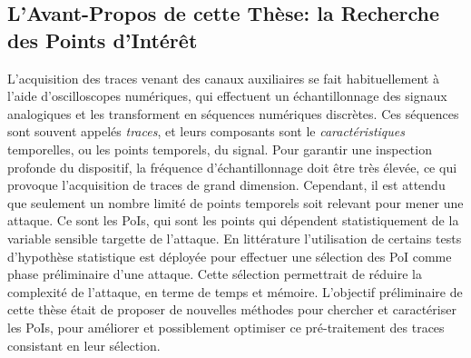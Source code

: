 \subsection{L'Avant-Propos de cette Th\`{e}se: la Recherche des Points d'Int\'{e}r\^{e}t}\label{sec:foreword}
L'acquisition des traces venant des canaux auxiliaires se fait habituellement \`{a} l'aide d'oscilloscopes num\'{e}riques, qui effectuent un \'{e}chantillonnage des signaux analogiques et les transforment en s\'{e}quences num\'{e}riques discr\`{e}tes. Ces s\'{e}quences sont souvent appel\'{e}s \emph{traces}, et leurs composants sont le \emph{caract\'{e}ristiques} temporelles, ou les points temporels, du signal. Pour garantir une inspection profonde du dispositif, la fr\'{e}quence d'\'{e}chantillonnage doit \^{e}tre tr\`{e}s \'{e}lev\'{e}e, ce qui provoque l'acquisition de traces de grand dimension. Cependant, il est attendu que seulement un nombre limit\'{e} de points temporels soit relevant pour mener une attaque. Ce sont les PoIs, qui sont les points qui d\'{e}pendent statistiquement de la variable sensible targette de l'attaque. En litt\'{e}rature l'utilisation de certains tests d'hypoth\`{e}se statistique est d\'{e}ploy\'{e}e pour effectuer une s\'{e}lection des PoI comme phase pr\'{e}liminaire d'une attaque. Cette s\'{e}lection permettrait de r\'{e}duire la complexit\'{e} de l'attaque, en terme de temps et m\'{e}moire. L'objectif pr\'{e}liminaire de cette th\`{e}se \'{e}tait de proposer de nouvelles m\'{e}thodes pour chercher et caract\'{e}riser les PoIs, pour am\'{e}liorer et possiblement optimiser ce pr\'{e}-traitement des traces consistant en leur s\'{e}lection.


